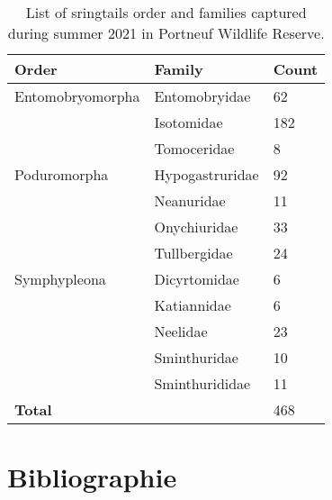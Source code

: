   \begin{table}[ht]
    \centering
    \caption[List of sringtails order and families]
    {List of sringtails order and families captured during summer 2021 in Portneuf Wildlife Reserve.}
    \label{tab:springtail}
    \begin{tabular}{lll} 
        \hline
        Order & Family & Count \\ [0.5ex] 
        \hline      
        Entomobryomorpha    & Entomobryidae     & 62 \\  
                            & Isotomidae        & 182 \\
                            & Tomoceridae       & 8 \\
        Poduromorpha        & Hypogastruridae   & 92 \\
                            & Neanuridae        & 11 \\
                            & Onychiuridae      & 33 \\
                            & Tullbergidae      & 24 \\
        Symphypleona        & Dicyrtomidae      & 6 \\
                            & Katiannidae       & 6 \\
                            & Neelidae          & 23 \\
                            & Sminthuridae      & 10 \\
                            & Sminthurididae    & 11 \\
                            \hline 
        \textbf{Total}      &                   & 468 \\
        \hline
    \end{tabular}
  \end{table}

\chapter*{Bibliographie}         
\label{chap:biblio}         

\nocite{*}
\renewcommand{\bibsection}{}
\begin{otherlanguage}{english}


\end{otherlanguage}
